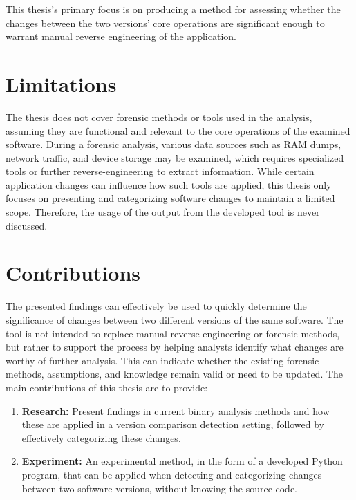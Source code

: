 This thesis's primary focus is on producing a method for assessing whether the changes between the two versions' core operations are significant enough to warrant manual reverse engineering of the application.

\section{Limitations}
\label{sec:limitations}
The thesis does not cover forensic methods or tools used in the analysis, assuming they are functional and relevant to the core operations of the examined software. During a forensic analysis, various data sources such as RAM dumps, network traffic, and device storage may be examined, which requires specialized tools or further reverse-engineering to extract information. While certain application changes can influence how such tools are applied, this thesis only focuses on presenting and categorizing software changes to maintain a limited scope. Therefore, the usage of the output from the developed tool is never discussed.

\section{Contributions}
\label{sec:contributions}

The presented findings can effectively be used to quickly determine the significance of changes between two different versions of the same software. The tool is not intended to replace manual reverse engineering or forensic methods, but rather to support the process by helping analysts identify what changes are worthy of further analysis. This can indicate whether the existing forensic methods, assumptions, and knowledge remain valid or need to be updated. The main contributions of this thesis are to provide: 

\begin{enumerate}
    \item \textbf{Research:} Present findings in current binary analysis methods and how these are applied in a version comparison detection setting, followed by effectively categorizing these changes.

    \item \textbf{Experiment:} An experimental method, in the form of a developed Python program, that can be applied when detecting and categorizing changes between two software versions, without knowing the source code.
\end{enumerate}


